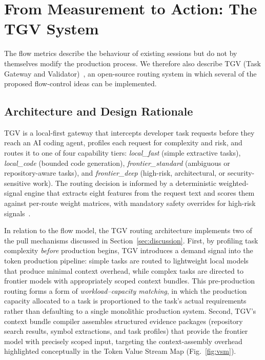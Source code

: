 \documentclass[journal]{IEEEtran}
\begin{document}
\section{From Measurement to Action: The TGV System}
\label{sec:tgv}

The flow metrics describe the behaviour of existing sessions but do not by themselves modify the production process. We therefore also describe TGV (Task Gateway and Validator)~\cite{griffin2026tgv}, an open-source routing system in which several of the proposed flow-control ideas can be implemented.

\subsection{Architecture and Design Rationale}

TGV is a local-first gateway that intercepts developer task requests before they reach an AI coding agent, profiles each request for complexity and risk, and routes it to one of four capability tiers: \emph{local\_fast} (simple extractive tasks), \emph{local\_code} (bounded code generation), \emph{frontier\_standard} (ambiguous or repository-aware tasks), and \emph{frontier\_deep} (high-risk, architectural, or security-sensitive work). The routing decision is informed by a deterministic weighted-signal engine that extracts eight features from the request text and scores them against per-route weight matrices, with mandatory safety overrides for high-risk signals~\cite{griffin2026tgv}.

In relation to the flow model, the TGV routing architecture implements two of the pull mechanisms discussed in Section~\ref{sec:discussion}. First, by profiling task complexity \emph{before} production begins, TGV introduces a demand signal into the token production pipeline: simple tasks are routed to lightweight local models that produce minimal context overhead, while complex tasks are directed to frontier models with appropriately scoped context bundles. This pre-production routing forms a form of \emph{workload--capacity matching}, in which the production capacity allocated to a task is proportioned to the task's actual requirements rather than defaulting to a single monolithic production system. Second, TGV's context bundle compiler assembles structured evidence packages (repository search results, symbol extractions, and task profiles) that provide the frontier model with precisely scoped input, targeting the context-assembly overhead highlighted conceptually in the Token Value Stream Map (Fig.~\ref{fig:vsm}).
\end{document}

